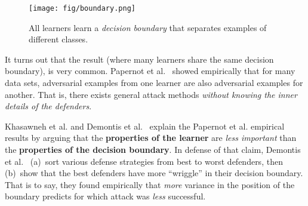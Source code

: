 
\begin{figure}
\texttt{[image: fig/boundary.png]}\caption{All learners learn a {\em decision boundary} that separates examples of different classes. }
\label{fig:boundary}
\end{figure}It turns out that the  result (where many learners share the same decision boundary), is very common.  Papernot et al.~\cite{papernot2016transferability} 
showed empirically that for many data sets,  adversarial examples from one learner are also adversarial examples for another.
That is, there exists general attack methods 
{\em without knowing the   inner   details of the defenders}.  



Khasawneh et al.\cite{khasawneh2017rhmd} and Demontis et al.~\cite{demontis2019adversarial} explain the Papernot et al. empirical results
by arguing that  
  the {\bf properties of the learner} are {\em less important} than 
  the {\bf properties of the decision boundary}.
In defense of that claim,
  Demontis et al.~\cite{demontis2019adversarial}
 (a)~sort various defense strategies from best to worst defenders, then (b)~show  
  that the best defenders have  more ``wriggle'' in their decision boundary. That is to say,
  they found 
  empirically that {\em  more} variance in the position of the boundary predicts for which attack was {\em less}  successful.
 
    

